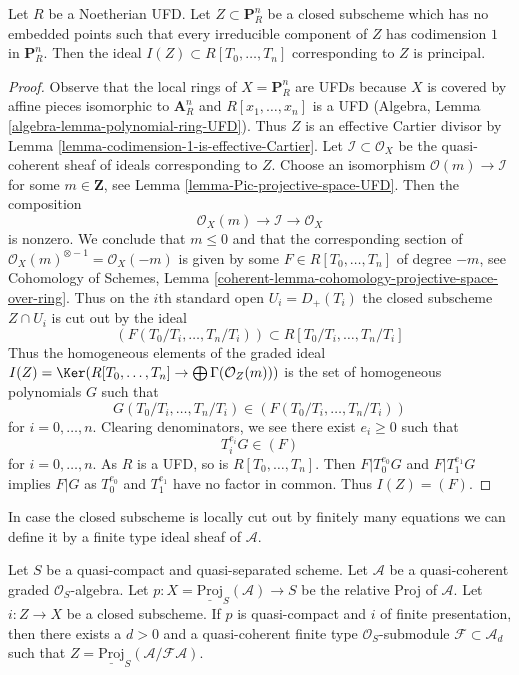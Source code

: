 \begin{lemma}
\label{lemma-equation-codim-1-in-projective-space}
Let $R$ be a Noetherian UFD. Let $Z \subset \mathbf{P}^n_R$ be a
closed subscheme
which has no embedded points such that every irreducible component
of $Z$ has codimension $1$ in $\mathbf{P}^n_R$.
Then the ideal $I(Z) \subset R[T_0, \ldots, T_n]$ corresponding
to $Z$ is principal.
\end{lemma}

\begin{proof}
Observe that the local rings of $X = \mathbf{P}^n_R$ are
UFDs because $X$ is covered by affine pieces isomorphic
to $\mathbf{A}^n_R$ and $R[x_1, \ldots, x_n]$ is a UFD
(Algebra, Lemma \ref{algebra-lemma-polynomial-ring-UFD}).
Thus $Z$ is an effective Cartier divisor by
Lemma \ref{lemma-codimension-1-is-effective-Cartier}.
Let $\mathcal{I} \subset \mathcal{O}_X$ be the quasi-coherent
sheaf of ideals corresponding to $Z$.
Choose an isomorphism $\mathcal{O}(m) \to \mathcal{I}$
for some $m \in \mathbf{Z}$, see
Lemma \ref{lemma-Pic-projective-space-UFD}.
Then the composition
$$
\mathcal{O}_X(m) \to \mathcal{I} \to \mathcal{O}_X
$$
is nonzero. We conclude that $m \leq 0$ and that the corresponding
section of $\mathcal{O}_X(m)^{\otimes -1} = \mathcal{O}_X(-m)$
is given by some $F \in R[T_0, \ldots, T_n]$ of degree $-m$, see
Cohomology of Schemes, Lemma
\ref{coherent-lemma-cohomology-projective-space-over-ring}.
Thus on the $i$th standard open $U_i = D_+(T_i)$ the
closed subscheme $Z \cap U_i$ is cut out by the ideal
$$
(F(T_0/T_i, \ldots, T_n/T_i)) \subset R[T_0/T_i, \ldots, T_n/T_i]
$$
Thus the homogeneous elements of the graded ideal
$I(Z) = \Ker(R[T_0, \ldots, T_n] \to \bigoplus \Gamma(\mathcal{O}_Z(m)))$
is the set of homogeneous polynomials $G$ such that
$$
G(T_0/T_i, \ldots, T_n/T_i) \in (F(T_0/T_i, \ldots, T_n/T_i))
$$
for $i = 0, \ldots, n$. Clearing denominators, we see there exist
$e_i \geq 0$ such that
$$
T_i^{e_i}G \in (F)
$$
for $i = 0, \ldots, n$. As $R$ is a UFD, so is $R[T_0, \ldots, T_n]$.
Then $F | T_0^{e_0}G$ and $F | T_1^{e_1}G$ implies $F | G$ as
$T_0^{e_0}$ and $T_1^{e_1}$ have no factor in common. Thus $I(Z) = (F)$.
\end{proof}

\noindent
In case the closed subscheme is locally cut out by finitely many
equations we can define it by a finite type ideal sheaf of
$\mathcal{A}$.

\begin{lemma}
\label{lemma-closed-subscheme-proj-finite}
Let $S$ be a quasi-compact and quasi-separated scheme.
Let $\mathcal{A}$ be a quasi-coherent graded $\mathcal{O}_S$-algebra. Let
$p : X = \underline{\text{Proj}}_S(\mathcal{A}) \to S$ be the relative
Proj of $\mathcal{A}$. Let $i : Z \to X$ be a closed subscheme.
If $p$ is quasi-compact and $i$ of finite presentation, then there exists
a $d > 0$ and a quasi-coherent finite type $\mathcal{O}_S$-submodule
$\mathcal{F} \subset \mathcal{A}_d$ such that
$Z = \underline{\text{Proj}}_S(\mathcal{A}/\mathcal{F}\mathcal{A})$.
\end{lemma}

